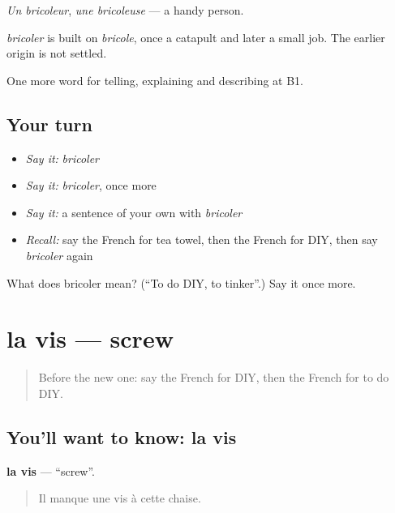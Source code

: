 \emph{Un bricoleur}, \emph{une bricoleuse} — a handy person.

\begin{cousinweb}
\emph{bricoler} is built on \emph{bricole}, once a catapult and later a small job. The earlier origin is not settled.
\end{cousinweb}

\begin{grammarlens}[title={What you've built}]
One more word for telling, explaining and describing at B1.
\end{grammarlens}

\subsection*{Your turn}
\begin{itemize}
\raggedright
  \item \emph{Say it:} \emph{bricoler}
  \item \emph{Say it:} \emph{bricoler}, once more
  \item \emph{Say it:} a sentence of your own with \emph{bricoler}
  \item \emph{Recall:} say the French for tea towel, then the French for DIY, then say \emph{bricoler} again
\end{itemize}

\begin{tcolorbox}[breakable,colback=teal!4,colframe=teal!35!black,title={Before you move on}]
What does bricoler mean? (\textquotedblleft{}To do DIY, to tinker\textquotedblright{}.) Say it once more.
\end{tcolorbox}
\section[la vis]{la vis — screw}

\label{lesson:FR-C531-vis}



\begin{quote}
Before the new one: say the French for DIY, then the French for to do DIY.
\end{quote}

\subsection*{You'll want to know: la vis}
\textbf{la vis} — \textquotedblleft{}screw\textquotedblright{}.

\begin{quote}
Il manque une vis à cette chaise.
\end{quote}

